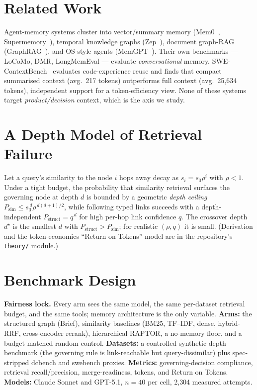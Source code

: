 \documentclass[11pt]{article}
\begin{document}
\section{Related Work}
Agent-memory systems cluster into vector/summary memory (Mem0~\cite{mem0},
Supermemory~\cite{supermemory}), temporal knowledge graphs (Zep~\cite{zep}), document
graph-RAG (GraphRAG~\cite{graphrag}), and OS-style agents (MemGPT~\cite{memgpt}). Their
own benchmarks --- LoCoMo, DMR, LongMemEval --- evaluate \emph{conversational} memory.
SWE-ContextBench~\cite{swecontextbench} evaluates code-experience reuse and finds that
compact summarised context (avg.\ 217 tokens) outperforms full context (avg.\ 25{,}634
tokens), independent support for a token-efficiency view. None of these systems target
\emph{product/decision} context, which is the axis we study.

\section{A Depth Model of Retrieval Failure}
Let a query's similarity to the node $i$ hops away decay as $s_i = s_0\rho^i$ with
$\rho<1$. Under a tight budget, the probability that similarity retrieval surfaces the
governing node at depth $d$ is bounded by a geometric \emph{depth ceiling}
$P_{\text{sim}} \le s_0^{\,d}\rho^{\,d(d+1)/2}$, while following typed links succeeds with
a depth-independent $P_{\text{struct}} = q^{\,d}$ for high per-hop link confidence $q$.
The crossover depth $d^\star$ is the smallest $d$ with
$P_{\text{struct}} > P_{\text{sim}}$; for realistic $(\rho, q)$ it is small. (Derivation
and the token-economics ``Return on Tokens'' model are in the repository's
\texttt{theory/} module.)

\section{Benchmark Design}
\textbf{Fairness lock.} Every arm sees the same model, the same per-dataset retrieval
budget, and the same tools; memory architecture is the only variable. \textbf{Arms:} the
structured graph (Brief), similarity baselines (BM25, TF--IDF, dense, hybrid-RRF,
cross-encoder rerank), hierarchical RAPTOR, a no-memory floor, and a budget-matched random
control. \textbf{Datasets:} a controlled synthetic depth benchmark (the governing rule is
link-reachable but query-dissimilar) plus spec-stripped dcbench and swebench proxies.
\textbf{Metrics:} governing-decision compliance, retrieval recall/precision,
merge-readiness, tokens, and Return on Tokens. \textbf{Models:} Claude Sonnet and GPT-5.1,
$n{=}40$ per cell, 2{,}304 measured attempts.
\end{document}
